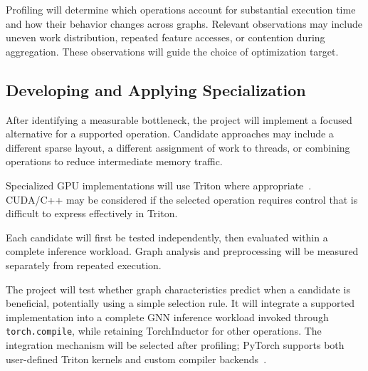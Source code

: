 Profiling will determine which operations account for substantial execution time and how their behavior changes across graphs. Relevant observations may include uneven work distribution, repeated feature accesses, or contention during aggregation. These observations will guide the choice of optimization target.

\subsection{Developing and Applying Specialization}

After identifying a measurable bottleneck, the project will implement a focused alternative for a supported operation. Candidate approaches may include a different sparse layout, a different assignment of work to threads, or combining operations to reduce intermediate memory traffic.

Specialized GPU implementations will use Triton where appropriate~\cite{tritonDocs}. CUDA/C++ may be considered if the selected operation requires control that is difficult to express effectively in Triton.

Each candidate will first be tested independently, then evaluated within a complete inference workload. Graph analysis and preprocessing will be measured separately from repeated execution.

The project will test whether graph characteristics predict when a candidate is beneficial, potentially using a simple selection rule. It will integrate a supported implementation into a complete GNN inference workload invoked through \texttt{torch.compile}, while retaining TorchInductor for other operations. The integration mechanism will be selected after profiling; PyTorch supports both user-defined Triton kernels and custom compiler backends~\cite{pytorchTritonCompile,pytorchCustomBackends}.
